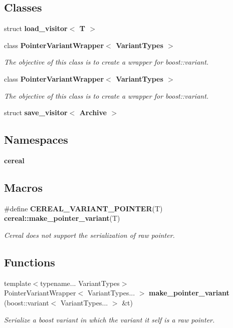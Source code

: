 \subsection*{Classes}
\begin{DoxyCompactItemize}
\item 
struct \textbf{ load\+\_\+visitor$<$ T $>$}
\item 
class \textbf{ Pointer\+Variant\+Wrapper$<$ Variant\+Types $>$}
\begin{DoxyCompactList}\small\item\em The objective of this class is to create a wrapper for boost\+::variant. \end{DoxyCompactList}\item 
class \textbf{ Pointer\+Variant\+Wrapper$<$ Variant\+Types $>$}
\begin{DoxyCompactList}\small\item\em The objective of this class is to create a wrapper for boost\+::variant. \end{DoxyCompactList}\item 
struct \textbf{ save\+\_\+visitor$<$ Archive $>$}
\end{DoxyCompactItemize}
\subsection*{Namespaces}
\begin{DoxyCompactItemize}
\item 
 \textbf{ cereal}
\end{DoxyCompactItemize}
\subsection*{Macros}
\begin{DoxyCompactItemize}
\item 
\#define \textbf{ C\+E\+R\+E\+A\+L\+\_\+\+V\+A\+R\+I\+A\+N\+T\+\_\+\+P\+O\+I\+N\+T\+ER}(T)~\textbf{ cereal\+::make\+\_\+pointer\+\_\+variant}(T)
\begin{DoxyCompactList}\small\item\em Cereal does not support the serialization of raw pointer. \end{DoxyCompactList}\end{DoxyCompactItemize}
\subsection*{Functions}
\begin{DoxyCompactItemize}
\item 
{\footnotesize template$<$typename... Variant\+Types$>$ }\\Pointer\+Variant\+Wrapper$<$ Variant\+Types... $>$ \textbf{ make\+\_\+pointer\+\_\+variant} (boost\+::variant$<$ Variant\+Types... $>$ \&t)
\begin{DoxyCompactList}\small\item\em Serialize a boost variant in which the variant it self is a raw pointer. \end{DoxyCompactList}\end{DoxyCompactItemize}


